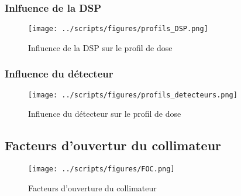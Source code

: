 \documentclass{article}
\begin{document}
\subsubsection{Inlfuence de la DSP}

\begin{figure}[h]
  \centering
  \texttt{[image: ../scripts/figures/profils\_DSP.png]}
  \caption{Influence de la DSP sur le profil de dose}
  \label{fig_profil_DSP}
\end{figure}

\subsubsection{Influence du détecteur}

\begin{figure}[h]
  \centering
  \texttt{[image: ../scripts/figures/profils\_detecteurs.png]}
  \caption{Influence du détecteur sur le profil de dose}
  \label{fig_profils_detecteur}
\end{figure}

\newpage
\subsection{Facteurs d'ouvertur du collimateur}

\begin{figure}[h]
  \centering
  \texttt{[image: ../scripts/figures/FOC.png]}
  \caption{Facteurs d'ouverture du collimateur}
  \label{fig_foc}
\end{figure}

\clearpage


\nocite{*}
\end{document}
